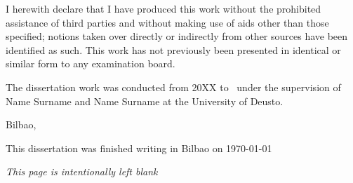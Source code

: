



\begin{declaration}        %

I herewith declare that I have produced this work without the prohibited assistance of third parties and without making use of aids other than those specified; notions taken over directly or indirectly from other sources have been identified as such. This work has not previously been presented in identical or similar form to any examination board.

The dissertation work was conducted from 20XX to \the\year \ under the supervision of
Name Surname
and 
Name Surname
at 
the University of Deusto.

\vspace{10mm}

Bilbao,




\end{declaration}




\thispagestyle{empty}

\hfill
\vfill
\medskip

\begin{center}
\noindent
This dissertation was finished writing 
in 
Bilbao
on
\today 
\end{center}

\vfill
\medskip
\vspace{1cm}
\bigskip



\clearpage
\thispagestyle{empty}

\hfill
\vfill
\medskip

\begin{center}
\textit{This page is intentionally left blank}
\end{center}

\vfill
\medskip
\vspace{1cm}
\bigskip


